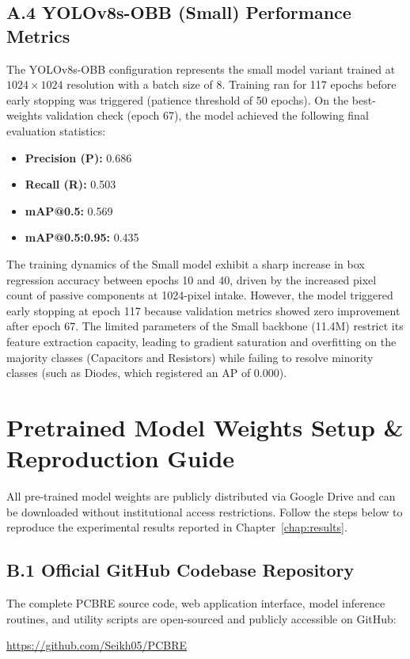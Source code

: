 \documentclass[12pt,a4paper]{report}
\begin{document}
\section*{A.4 YOLOv8s-OBB (Small) Performance Metrics}
The YOLOv8s-OBB configuration represents the small model variant trained at $1024 \times 1024$ resolution with a batch size of 8. Training ran for 117 epochs before early stopping was triggered (patience threshold of 50 epochs). On the best-weights validation check (epoch 67), the model achieved the following final evaluation statistics:
\begin{itemize}
  \item \textbf{Precision (P):} 0.686
  \item \textbf{Recall (R):} 0.503
  \item \textbf{mAP@0.5:} 0.569
  \item \textbf{mAP@0.5:0.95:} 0.435
\end{itemize}

The training dynamics of the Small model exhibit a sharp increase in box regression accuracy between epochs 10 and 40, driven by the increased pixel count of passive components at 1024-pixel intake. However, the model triggered early stopping at epoch 117 because validation metrics showed zero improvement after epoch 67. The limited parameters of the Small backbone (11.4M) restrict its feature extraction capacity, leading to gradient saturation and overfitting on the majority classes (Capacitors and Resistors) while failing to resolve minority classes (such as Diodes, which registered an AP of 0.000).


\chapter{Pretrained Model Weights Setup \& Reproduction Guide}
\label{app:weights}

All pre-trained model weights are publicly distributed via Google Drive and can be downloaded without institutional access restrictions. Follow the steps below to reproduce the experimental results reported in Chapter~\ref{chap:results}.

\section*{B.1 Official GitHub Codebase Repository}
The complete PCBRE source code, web application interface, model inference routines, and utility scripts are open-sourced and publicly accessible on GitHub:
\begin{center}
\url{https://github.com/Seikh05/PCBRE}
\end{center}
\end{document}
